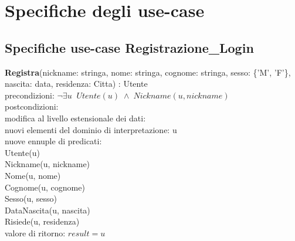 \documentclass[a4paper,12pt]{report}
\begin{document}
    \chapter{Specifiche degli use-case}
      \section*{Specifiche use-case Registrazione\_Login}
        \textbf{Registra}(nickname: stringa, nome: stringa, cognome: stringa, sesso: \{'M', 'F'\}, nascita: data, residenza: Citta) : Utente \\
        \hspace*{1cm} precondizioni: $\neg \exists u \;\; Utente(u) \; \wedge \; Nickname(u, nickname)$ \\
        \hspace*{1cm} postcondizioni: \\
        \hspace*{2cm} modifica al livello estensionale dei dati: \\
        \hspace*{3cm} nuovi elementi del dominio di interpretazione: u \\
        \hspace*{3cm} nuove ennuple di predicati: \\
        \hspace*{4cm} Utente(u) \\
        \hspace*{4cm} Nickname(u, nickname) \\
        \hspace*{4cm} Nome(u, nome) \\
        \hspace*{4cm} Cognome(u, cognome) \\
        \hspace*{4cm} Sesso(u, sesso) \\
        \hspace*{4cm} DataNascita(u, nascita) \\
        \hspace*{4cm} Risiede(u, residenza) \\
        \hspace*{2cm} valore di ritorno: $result = u$ \\ \\
\end{document}
